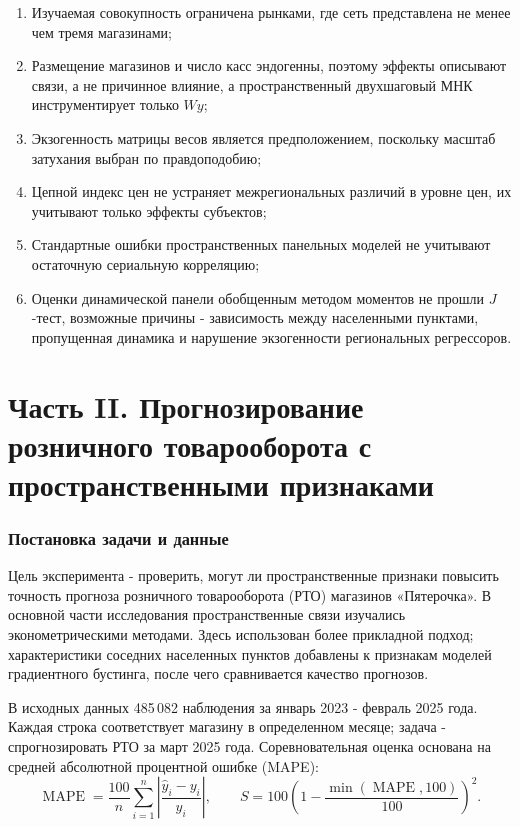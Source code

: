 \documentclass[12pt, a4paper]{article}
\begin{document}
\begin{enumerate}
    \item Изучаемая совокупность ограничена рынками, где сеть представлена не менее чем тремя
    магазинами;
    \item Размещение магазинов и число касс эндогенны, поэтому эффекты описывают связи, а не
    причинное влияние, а пространственный двухшаговый МНК инструментирует только $Wy$;
    \item Экзогенность матрицы весов является предположением, поскольку масштаб затухания выбран
    по правдоподобию;
    \item Цепной индекс цен не устраняет межрегиональных различий в уровне цен, их учитывают
    только эффекты субъектов;
    \item Стандартные ошибки пространственных панельных моделей не учитывают остаточную
    сериальную корреляцию;
    \item Оценки динамической панели обобщенным методом моментов не прошли $J$-тест, возможные
    причины - зависимость между населенными пунктами, пропущенная динамика и нарушение
    экзогенности региональных регрессоров.
\end{enumerate}

\clearpage

\part*{Часть II. Прогнозирование розничного товарооборота с пространственными признаками}
\label{sec:forecast}

\section*{Постановка задачи и данные}

Цель эксперимента - проверить, могут ли пространственные признаки повысить точность прогноза розничного товарооборота (РТО) магазинов «Пятерочка».
В основной части исследования пространственные связи изучались эконометрическими методами.
Здесь использован более прикладной подход; характеристики соседних населенных пунктов добавлены к признакам моделей градиентного бустинга,
после чего сравнивается качество прогнозов.

В исходных данных 485\,082 наблюдения за январь 2023 - февраль 2025 года.
Каждая строка соответствует магазину в определенном месяце; задача - спрогнозировать РТО за март 2025 года.
Соревновательная оценка основана на средней абсолютной процентной ошибке (MAPE):
\begin{equation}
\operatorname{MAPE}=\frac{100}{n}\sum_{i=1}^n\left|\frac{\widehat y_i-y_i}{y_i}\right|,
\qquad
S=100\left(1-\frac{\min(\operatorname{MAPE},100)}{100}\right)^2.
\label{eq:score}
\end{equation}
\end{document}
